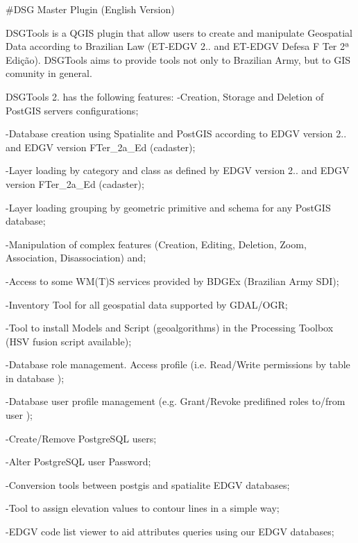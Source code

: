 \href{https://gitter.im/DsgTools/Lobby?utm_source=badge&utm_medium=badge&utm_campaign=pr-badge&utm_content=badge}{\tt } 

 \#\+D\+SG Master Plugin (English Version)

D\+S\+G\+Tools is a Q\+G\+IS plugin that allow users to create and manipulate Geospatial Data according to Brazilian Law (E\+T-\/\+E\+D\+GV 2.. and E\+T-\/\+E\+D\+GV Defesa F Ter 2ª Edição). D\+S\+G\+Tools aims to provide tools not only to Brazilian Army, but to G\+IS comunity in general.

D\+S\+G\+Tools 2. has the following features\+: -\/\+Creation, Storage and Deletion of Post\+G\+IS servers configurations;

-\/\+Database creation using Spatialite and Post\+G\+IS according to E\+D\+GV version 2.. and E\+D\+GV version F\+Ter\+\_\+2a\+\_\+\+Ed (cadaster);

-\/\+Layer loading by category and class as defined by E\+D\+GV version 2.. and E\+D\+GV version F\+Ter\+\_\+2a\+\_\+\+Ed (cadaster);

-\/\+Layer loading grouping by geometric primitive and schema for any Post\+G\+IS database;

-\/\+Manipulation of complex features (Creation, Editing, Deletion, Zoom, Association, Disassociation) and;

-\/\+Access to some W\+M(\+T)S services provided by B\+D\+G\+Ex (Brazilian Army S\+DI);

-\/\+Inventory Tool for all geospatial data supported by G\+D\+A\+L/\+O\+GR;

-\/\+Tool to install Models and Script (geoalgorithms) in the Processing Toolbox (H\+SV fusion script available);

-\/\+Database role management. Access profile (i.\+e. Read/\+Write permissions by table in database );

-\/\+Database user profile management (e.\+g. Grant/\+Revoke predifined roles to/from user );

-\/\+Create/\+Remove Postgre\+S\+QL users;

-\/\+Alter Postgre\+S\+QL user Password;

-\/\+Conversion tools between postgis and spatialite E\+D\+GV databases;

-\/\+Tool to assign elevation values to contour lines in a simple way;

-\/\+E\+D\+GV code list viewer to aid attributes queries using our E\+D\+GV databases;

